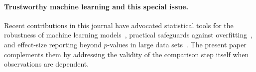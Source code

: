 \paragraph{Trustworthy machine learning and this special issue.}
Recent contributions in this journal have advocated statistical tools for the robustness of machine learning models~\cite{giudici2024}, practical safeguards against overfitting~\cite{chicco2026}, and effect-size reporting beyond $p$-values in large data sets~\cite{caponero2026}. The present paper complements them by addressing the validity of the comparison step itself when observations are dependent.
